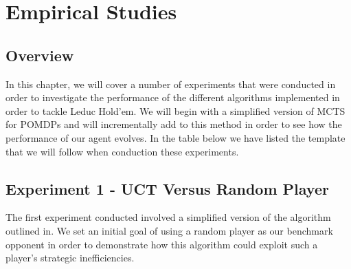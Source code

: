 
\chapter{Empirical Studies}\label{ch:empirical}

\section{Overview}\label{sec:empOverview}
In this chapter, we will cover a number of experiments that were conducted in order to investigate
the performance of the different algorithms implemented in order to tackle Leduc Hold'em.
We will begin with a simplified version of MCTS for POMDPs and will incrementally add to this
method in order to see how the performance of our agent evolves.
In the table below we have listed the template that we will follow when conduction these experiments.



\section{Experiment 1 - UCT Versus Random Player}\label{sec:expmeriment1}
The first experiment conducted involved a simplified version of the algorithm outlined in\citep{heinrich2017reinforcement}.
We set an initial goal of using a random player as our benchmark opponent in order to demonstrate how
this algorithm could exploit such a player's strategic inefficiencies.

